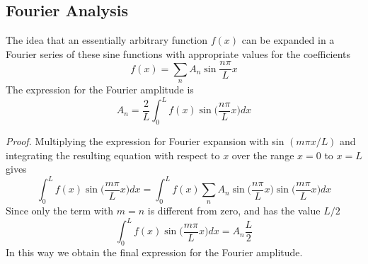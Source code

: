 \documentclass[../../../main.tex]{subfiles}
\begin{document}
\subsection*{Fourier Analysis}
The idea that an essentially arbitrary function $f (x)$ can be expanded in a Fourier series of these sine functions with appropriate values for the coefficients
\begin{equation*}
    f(x)=\sum_{n}A_n\sin \frac{n\pi}{L}x
\end{equation*}
The expression for the Fourier amplitude is 
\begin{equation*}
    A_n=\frac{2}{L}\int_{0}^{L}f(x)\sin \biggl(\frac{n\pi}{L}x\biggr)dx
\end{equation*}

\emph{Proof.} Multiplying the expression for Fourier expansion with sin $(m \pi x/L)$ and integrating the resulting equation with respect to $x$ over the range $x = 0$ to $x = L$ gives
\begin{equation*}
    \int_{0}^{L}f(x)\sin \biggl(\frac{m\pi}{L}x\biggr)dx=\int_{0}^{L}f(x)\sum_{n}A_n\sin \biggl(\frac{n\pi}{L}x\biggr)\sin \biggl(\frac{m\pi}{L}x\biggr)dx
\end{equation*}
Since only the term with $m = n$ is different from zero, and has the value $L/2$
\begin{equation*}
    \int_{0}^{L}f(x)\sin \biggl(\frac{m\pi}{L}x\biggr)dx=A_n\frac{L}{2}
\end{equation*}
In this way we obtain the final expression for the Fourier amplitude.
\end{document}
